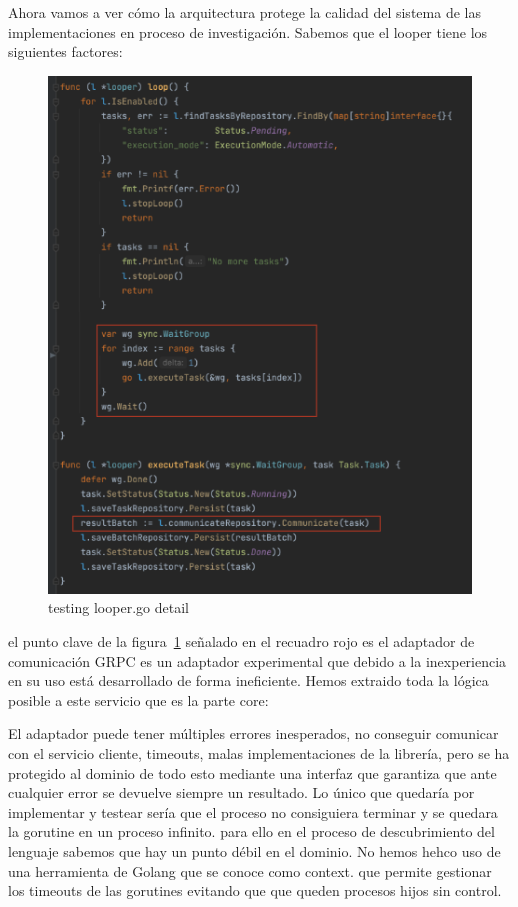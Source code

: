 Ahora vamos a ver cómo la arquitectura protege la calidad del sistema de las implementaciones en proceso de investigación. Sabemos que el looper tiene los siguientes factores:

\begin{figure}[H]
    \centering
    \includegraphics[height=0.3\textheight]{./part/Ejecucion/Seguimiento/Testing/img/Looper}
    \caption{testing looper.go detail}\label{fig:testingLooper}
\end{figure}

el punto clave de la figura~\cref{fig:testingLooper} señalado en el recuadro rojo es el adaptador de comunicación GRPC es un adaptador experimental que debido a la inexperiencia en su uso está desarrollado de forma ineficiente. Hemos extraido toda la lógica posible a este servicio que es la parte core:

El adaptador puede tener múltiples errores inesperados, no conseguir comunicar con el servicio cliente, timeouts, malas implementaciones de la librería, pero se ha protegido al dominio de todo esto mediante una interfaz que garantiza que ante cualquier error se devuelve siempre un resultado. Lo único que quedaría por implementar y testear sería que el proceso no consiguiera terminar y se quedara la gorutine en un proceso infinito. para ello en el proceso de descubrimiento del lenguaje sabemos que hay un punto débil en el dominio. No hemos hehco uso de una herramienta de Golang que se conoce como context. que permite gestionar los timeouts de las gorutines evitando que que queden procesos hijos sin control.

